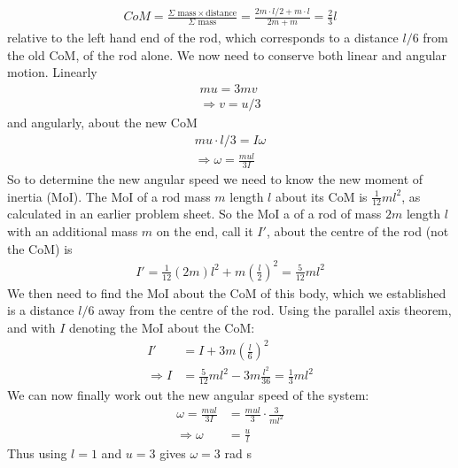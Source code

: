 \begin{hint}
{\begin{enumerate}
\begin{align*}
CoM=\frac{\Sigma \textrm{ mass}\times \textrm{distance}}{\Sigma \textrm{ mass}}=\frac{2m\cdot l/2+m\cdot l}{2m+m}=\frac{2}{3}l
\end{align*}
relative to the left hand end of the rod, which corresponds to a distance $l/6$ from the old CoM, of the rod alone. 
We now need to conserve both linear and angular motion. Linearly
\begin{align*}
mu=3mv \\
\Rightarrow v=u/3
\end{align*}
and angularly, about the new CoM
\begin{align*}
mu\cdot l/3=I\omega \\
\Rightarrow \omega=\frac{mul}{3I}
\end{align*}
So to determine the new angular speed we need to know the new moment of inertia (MoI). The MoI of a rod mass $m$ length $l$ about its CoM is $\frac{1}{12}ml^2$, as calculated in an earlier problem sheet. So the MoI a of a rod of mass $2m$ length $l$ with an additional mass $m$ on the end, call it $I'$, about the centre of the rod (not the CoM) is
\begin{align*}
I'=\frac{1}{12}(2m)l^2+m\left(\frac{l}{2}\right)^2=\frac{5}{12}ml^2
\end{align*}
We then need to find the MoI about the CoM of this body, which we established is a distance $l/6$ away from the centre of the rod. Using the parallel axis theorem, and with $I$ denoting the MoI about the CoM:
\begin{align*}
I'&=I+3m\left(\frac{l}{6}\right)^2 \\
\Rightarrow I&=\frac{5}{12}ml^2-3m\frac{l^2}{36}=\frac{1}{3}ml^2
\end{align*}
We can now finally work out the new angular speed of the system:
\begin{align*}
\omega=\frac{mul}{3I}&=\frac{mul}{3}\cdot\frac{3}{ml^2} \\
\Rightarrow \omega&=\frac{u}{l}
\end{align*}
Thus using $l=1$ and $u=3$ gives $\omega = 3$ rad s


\end{enumerate}}
\end{hint}
